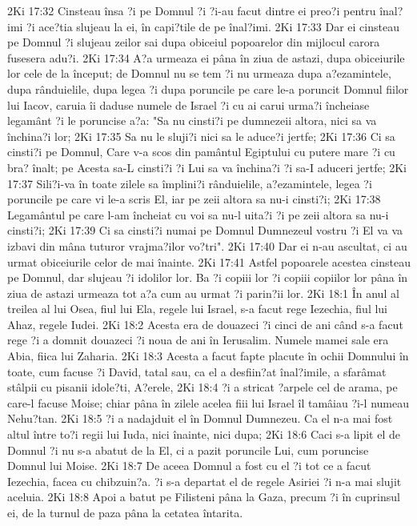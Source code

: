 2Ki 17:32  Cinsteau însa ?i pe Domnul ?i ?i-au facut dintre ei preo?i pentru înal?imi ?i ace?tia slujeau la ei, în capi?tile de pe înal?imi.
2Ki 17:33  Dar ei cinsteau pe Domnul ?i slujeau zeilor sai dupa obiceiul popoarelor din mijlocul carora fusesera adu?i.
2Ki 17:34  A?a urmeaza ei pâna în ziua de astazi, dupa obiceiurile lor cele de la început; de Domnul nu se tem ?i nu urmeaza dupa a?ezamintele, dupa rânduielile, dupa legea ?i dupa poruncile pe care le-a poruncit Domnul fiilor lui Iacov, caruia îi daduse numele de Israel ?i cu ai carui urma?i încheiase legamânt ?i le poruncise a?a: "Sa nu cinsti?i pe dumnezeii altora, nici sa va închina?i lor;
2Ki 17:35  Sa nu le sluji?i nici sa le aduce?i jertfe;
2Ki 17:36  Ci sa cinsti?i pe Domnul, Care v-a scos din pamântul Egiptului cu putere mare ?i cu bra? înalt; pe Acesta sa-L cinsti?i ?i Lui sa va închina?i ?i sa-I aduceri jertfe;
2Ki 17:37  Sili?i-va în toate zilele sa împlini?i rânduielile, a?ezamintele, legea ?i poruncile pe care vi le-a scris El, iar pe zeii altora sa nu-i cinsti?i;
2Ki 17:38  Legamântul pe care l-am încheiat cu voi sa nu-l uita?i ?i pe zeii altora sa nu-i cinsti?i;
2Ki 17:39  Ci sa cinsti?i numai pe Domnul Dumnezeul vostru ?i El va va izbavi din mâna tuturor vrajma?ilor vo?tri".
2Ki 17:40  Dar ei n-au ascultat, ci au urmat obiceiurile celor de mai înainte.
2Ki 17:41  Astfel popoarele acestea cinsteau pe Domnul, dar slujeau ?i idolilor lor. Ba ?i copiii lor ?i copiii copiilor lor pâna în ziua de astazi urmeaza tot a?a cum au urmat ?i parin?ii lor.
2Ki 18:1  În anul al treilea al lui Osea, fiul lui Ela, regele lui Israel, s-a facut rege Iezechia, fiul lui Ahaz, regele Iudei.
2Ki 18:2  Acesta era de douazeci ?i cinci de ani când s-a facut rege ?i a domnit douazeci ?i noua de ani în Ierusalim. Numele mamei sale era Abia, fiica lui Zaharia.
2Ki 18:3  Acesta a facut fapte placute în ochii Domnului în toate, cum facuse ?i David, tatal sau, ca el a desfiin?at înal?imile, a sfarâmat stâlpii cu pisanii idole?ti, A?erele,
2Ki 18:4  ?i a stricat ?arpele cel de arama, pe care-l facuse Moise; chiar pâna în zilele acelea fiii lui Israel îl tamâiau ?i-l numeau Nehu?tan.
2Ki 18:5  ?i a nadajduit el în Domnul Dumnezeu. Ca el n-a mai fost altul între to?i regii lui Iuda, nici înainte, nici dupa;
2Ki 18:6  Caci s-a lipit el de Domnul ?i nu s-a abatut de la El, ci a pazit poruncile Lui, cum poruncise Domnul lui Moise.
2Ki 18:7  De aceea Domnul a fost cu el ?i tot ce a facut Iezechia, facea cu chibzuin?a. ?i s-a departat el de regele Asiriei ?i n-a mai slujit aceluia.
2Ki 18:8  Apoi a batut pe Filisteni pâna la Gaza, precum ?i în cuprinsul ei, de la turnul de paza pâna la cetatea întarita.
